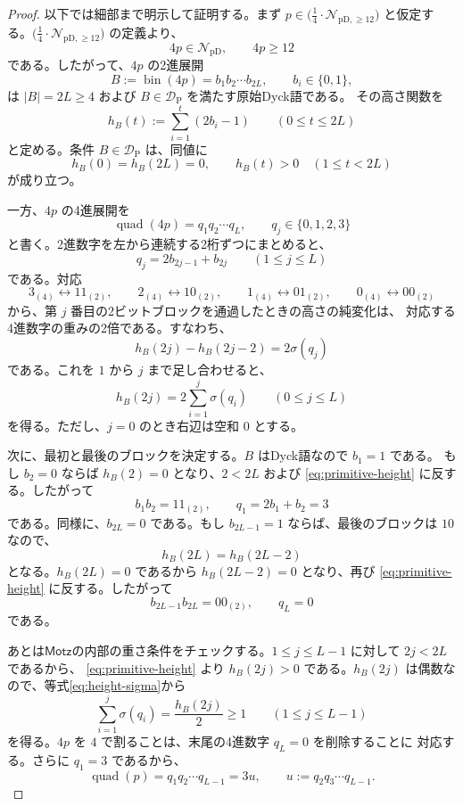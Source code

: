 \documentclass[12pt]{ltjsarticle}
\theoremstyle{plain}
\theoremstyle{definition}
\theoremstyle{plain}
\newcommand{\NpD}{\mathcal{N}_{\mathrm{pD}}}
\newcommand{\DP}{\mathcal{D}_{\mathrm{P}}}
\newcommand{\Pset}{%
  \bigl(\tfrac{1}{4}\cdot\mathcal{N}_{\mathrm{pD},\geq 12}\bigr)%
}
\begin{document}
\begin{proof}
以下では細部まで明示して証明する。まず $p\in\Pset$ と仮定する。$\Pset$ の定義より、
\[
 4p\in\NpD,\qquad 4p\geq12
\]
である。したがって、$4p$ の2進展開
\[
 B:=\operatorname{bin}(4p)=b_1b_2\cdots b_{2L},
 \qquad b_i\in\{0,1\},
\]
は $|B|=2L\geq4$ および $B\in\DP$ を満たす原始Dyck語である。
その高さ関数を
\[
 h_B(t):=\sum_{i=1}^{t}(2b_i-1)
 \qquad(0\leq t\leq2L)
\]
と定める。条件 $B\in\DP$ は、同値に
\begin{equation}\label{eq:primitive-height}
 h_B(0)=h_B(2L)=0,
 \qquad
 h_B(t)>0\quad(1\leq t<2L)
\end{equation}
が成り立つ。

一方、$4p$ の4進展開を
\[
 \operatorname{quad}(4p)=q_1q_2\cdots q_L,
 \qquad q_j\in\{0,1,2,3\}
\]
と書く。2進数字を左から連続する2桁ずつにまとめると、
\[
 q_j=2b_{2j-1}+b_{2j}
 \qquad(1\leq j\leq L)
\]
である。対応
\[
 3_{(4)}\longleftrightarrow11_{(2)},\qquad
 2_{(4)}\longleftrightarrow10_{(2)},\qquad
 1_{(4)}\longleftrightarrow01_{(2)},\qquad
 0_{(4)}\longleftrightarrow00_{(2)}
\]
から、第 $j$ 番目の2ビットブロックを通過したときの高さの純変化は、
対応する4進数字の重みの2倍である。すなわち、
\[
 h_B(2j)-h_B(2j-2)=2\sigma(q_j)
\]
である。これを $1$ から $j$ まで足し合わせると、
\begin{equation}\label{eq:height-sigma}
 h_B(2j)=2\sum_{i=1}^{j}\sigma(q_i)
 \qquad(0\leq j\leq L)
\end{equation}
を得る。ただし、$j=0$ のとき右辺は空和 $0$ とする。

次に、最初と最後のブロックを決定する。$B$ はDyck語なので $b_1=1$ である。
もし $b_2=0$ ならば $h_B(2)=0$ となり、$2<2L$ および
\eqref{eq:primitive-height} に反する。したがって
\[
 b_1b_2=11_{(2)},
 \qquad
 q_1=2b_1+b_2=3
\]
である。同様に、$b_{2L}=0$ である。もし $b_{2L-1}=1$ ならば、最後のブロックは
$10$ なので、
\[
 h_B(2L)=h_B(2L-2)
\]
となる。$h_B(2L)=0$ であるから $h_B(2L-2)=0$ となり、再び
\eqref{eq:primitive-height} に反する。したがって
\[
 b_{2L-1}b_{2L}=00_{(2)},
 \qquad
 q_L=0
\]
である。

あとは$\mathsf{Motz}$の内部の重さ条件をチェックする。$1\leq j\leq L-1$ に対して $2j<2L$ であるから、
\eqref{eq:primitive-height} より $h_B(2j)>0$ である。$h_B(2j)$ は偶数なので、等式\eqref{eq:height-sigma}から
\begin{equation}\label{eq:prefix-height}
 \sum_{i=1}^{j}\sigma(q_i)
 =\frac{h_B(2j)}{2}
 \geq1
 \qquad(1\leq j\leq L-1)
\end{equation}
を得る。$4p$ を $4$ で割ることは、末尾の4進数字 $q_L=0$ を削除することに
対応する。さらに $q_1=3$ であるから、
\[
 \operatorname{quad}(p)=q_1q_2\cdots q_{L-1}=3u,
 \qquad
 u:=q_2q_3\cdots q_{L-1}.
\]


\end{proof}
\end{document}
